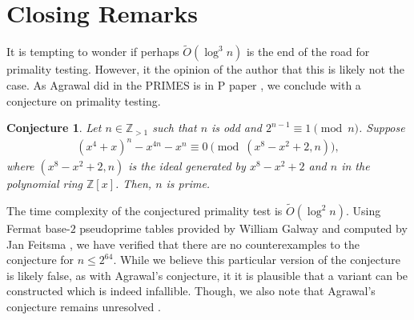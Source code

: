 \documentclass{article}
\theoremstyle{plain}
\newtheorem*{conjecture*}{Conjecture}
\theoremstyle{definition}
\newcommand{\Z}{\mathbb{Z}}
\begin{document}
\section{Closing Remarks}
It is tempting to wonder if perhaps $\tilde{O}(\log^3 n)$ is the end of the road for primality testing. However, it the opinion of the author that this is likely not the case. As Agrawal did in the PRIMES is in P paper \cite{aks2002}, we conclude with a conjecture on primality testing.
\begin{conjecture*}
Let $n \in \mathbb{Z}_{>1}$ such that $n$ is odd and $2^{n-1} \equiv 1 \pmod{n}$. Suppose
\begin{align*}
    (x^4 + x)^n - x^{4n} - x^n \equiv 0 \pmod{(x^8 - x^2 + 2, n)} ,
\end{align*}
where $(x^8 - x^2 + 2, n)$ is the ideal generated by $x^8 - x^2 + 2$ and $n$ in the polynomial ring $\Z[x]$. Then, $n$ is prime.
\end{conjecture*}
The time complexity of the conjectured primality test is $\tilde{O}(\log^2 n)$. Using Fermat base-$2$ pseudoprime tables provided by William Galway and computed by  Jan Feitsma \cite{pseudoprimestables}, we have verified that there are no counterexamples to the conjecture for $n \leq 2^{64}$. While we believe this particular version of the conjecture is likely false, as with Agrawal's conjecture, it it is plausible that a variant can be constructed which is indeed infallible. Though, we also note that Agrawal's conjecture remains unresolved \cite{lenstra2003agrawal, popovych2009agrawal}.

\newpage
\begingroup
\raggedright


\endgroup
\end{document}
